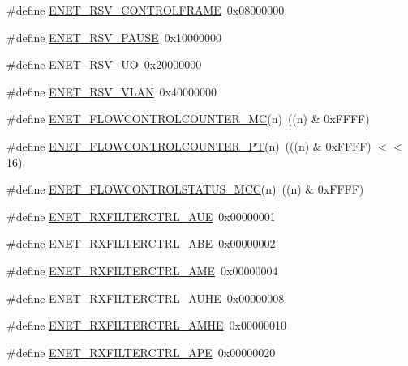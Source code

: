\begin{DoxyCompactItemize}
\item 
\#define \hyperlink{group__ENET__17XX__40XX_ga4ad18351df747e65f1b3fff139c8d552}{E\-N\-E\-T\-\_\-\-R\-S\-V\-\_\-\-C\-O\-N\-T\-R\-O\-L\-F\-R\-A\-M\-E}~0x08000000
\item 
\#define \hyperlink{group__ENET__17XX__40XX_ga7ad487168e3201b01eab8504e623d79b}{E\-N\-E\-T\-\_\-\-R\-S\-V\-\_\-\-P\-A\-U\-S\-E}~0x10000000
\item 
\#define \hyperlink{group__ENET__17XX__40XX_gae2f33f7ad025f84d58c97ccb9fecf89a}{E\-N\-E\-T\-\_\-\-R\-S\-V\-\_\-\-U\-O}~0x20000000
\item 
\#define \hyperlink{group__ENET__17XX__40XX_gabe88542e8c0a6fb6ea649cba94d2028d}{E\-N\-E\-T\-\_\-\-R\-S\-V\-\_\-\-V\-L\-A\-N}~0x40000000
\item 
\#define \hyperlink{group__ENET__17XX__40XX_ga6792fccacadbec16632406f00afbb202}{E\-N\-E\-T\-\_\-\-F\-L\-O\-W\-C\-O\-N\-T\-R\-O\-L\-C\-O\-U\-N\-T\-E\-R\-\_\-\-M\-C}(n)~((n) \& 0x\-F\-F\-F\-F)
\item 
\#define \hyperlink{group__ENET__17XX__40XX_ga08d75c6c9a79476c9473d49efea2eb4b}{E\-N\-E\-T\-\_\-\-F\-L\-O\-W\-C\-O\-N\-T\-R\-O\-L\-C\-O\-U\-N\-T\-E\-R\-\_\-\-P\-T}(n)~(((n) \& 0x\-F\-F\-F\-F) $<$$<$ 16)
\item 
\#define \hyperlink{group__ENET__17XX__40XX_gaa8ef1915c4211c216269ae6f5c7bad26}{E\-N\-E\-T\-\_\-\-F\-L\-O\-W\-C\-O\-N\-T\-R\-O\-L\-S\-T\-A\-T\-U\-S\-\_\-\-M\-C\-C}(n)~((n) \& 0x\-F\-F\-F\-F)
\item 
\#define \hyperlink{group__ENET__17XX__40XX_ga61d70abfbcb89e08b14d7aa571520db3}{E\-N\-E\-T\-\_\-\-R\-X\-F\-I\-L\-T\-E\-R\-C\-T\-R\-L\-\_\-\-A\-U\-E}~0x00000001
\item 
\#define \hyperlink{group__ENET__17XX__40XX_gaa63bf71c0439dc5176b4af167f4c7f75}{E\-N\-E\-T\-\_\-\-R\-X\-F\-I\-L\-T\-E\-R\-C\-T\-R\-L\-\_\-\-A\-B\-E}~0x00000002
\item 
\#define \hyperlink{group__ENET__17XX__40XX_ga868a51913649ab45dce2ed495d09e401}{E\-N\-E\-T\-\_\-\-R\-X\-F\-I\-L\-T\-E\-R\-C\-T\-R\-L\-\_\-\-A\-M\-E}~0x00000004
\item 
\#define \hyperlink{group__ENET__17XX__40XX_ga14e7ab247ade314679d3546278102373}{E\-N\-E\-T\-\_\-\-R\-X\-F\-I\-L\-T\-E\-R\-C\-T\-R\-L\-\_\-\-A\-U\-H\-E}~0x00000008
\item 
\#define \hyperlink{group__ENET__17XX__40XX_ga9d6abb88eb71199e6b8206c71ecc1148}{E\-N\-E\-T\-\_\-\-R\-X\-F\-I\-L\-T\-E\-R\-C\-T\-R\-L\-\_\-\-A\-M\-H\-E}~0x00000010
\item 
\#define \hyperlink{group__ENET__17XX__40XX_ga86aaaa49bc70fe343262a4373c056c87}{E\-N\-E\-T\-\_\-\-R\-X\-F\-I\-L\-T\-E\-R\-C\-T\-R\-L\-\_\-\-A\-P\-E}~0x00000020
$$
\end{DoxyCompactItemize}

